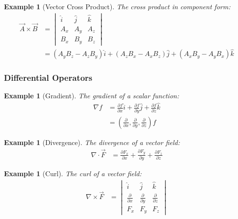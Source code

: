 \documentclass{article}
\newtheorem{example}[theorem]{Example}
\begin{document}
\begin{example}[Vector Cross Product]
The cross product in component form:
\begin{align*}
    \vec{A} \times \vec{B} &= \begin{vmatrix}
        \hat{i} & \hat{j} & \hat{k} \\
        A_x & A_y & A_z \\
        B_x & B_y & B_z
    \end{vmatrix} \\
    &= (A_y B_z - A_z B_y)\hat{i} + (A_z B_x - A_x B_z)\hat{j} + (A_x B_y - A_y B_x)\hat{k}
\end{align*}
\end{example}

\subsubsection{Differential Operators}
\begin{example}[Gradient]
The gradient of a scalar function:
\begin{align*}
    \nabla f &= \frac{\partial f}{\partial x}\hat{i} + \frac{\partial f}{\partial y}\hat{j} + \frac{\partial f}{\partial z}\hat{k} \\
    &= \left(\frac{\partial}{\partial x}, \frac{\partial}{\partial y}, \frac{\partial}{\partial z}\right)f
\end{align*}
\end{example}

\begin{example}[Divergence]
The divergence of a vector field:
\begin{align*}
    \nabla \cdot \vec{F} &= \frac{\partial F_x}{\partial x} + \frac{\partial F_y}{\partial y} + \frac{\partial F_z}{\partial z}
\end{align*}
\end{example}

\begin{example}[Curl]
The curl of a vector field:
\begin{align*}
    \nabla \times \vec{F} &= \begin{vmatrix}
        \hat{i} & \hat{j} & \hat{k} \\
        \frac{\partial}{\partial x} & \frac{\partial}{\partial y} & \frac{\partial}{\partial z} \\
        F_x & F_y & F_z
    \end{vmatrix}
\end{align*}
\end{example}
\end{document}
